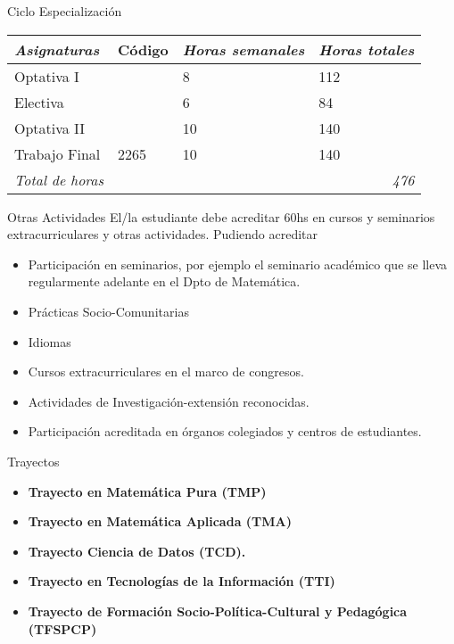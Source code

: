 \documentclass[11pt]{beamer}
\begin{document}
\begin{frame}{Ciclo Especialización}
 \fontsize{12pt}{12pt}\selectfont
 \begin{center}
\begin{tabularx}{1\textwidth}{|p{5cm}|p{1.5cm}|p{1.5cm}|p{1.5cm}|}
\hline
  \rowcolor[gray]{.9}
\emph{Asignaturas  } & Código&\emph{Horas semanales} & 
\emph{Horas totales}      \\ \hline
Optativa I                     &           &            8        &         112        \\ \hline
 Electiva                 &            &    6                &        84          \\ \hline
 Optativa II                    &            &           10         &          140        \\ \hline
 Trabajo Final                     & 2265         &       10             &          140        \\ \hline
\emph{Total de horas }    & \multicolumn{3}{r|}{\emph{476 }} \\ \hline
\end{tabularx}
\end{center}
\end{frame}
 
 \begin{frame}{Otras Actividades}
 El/la estudiante debe acreditar 60hs en cursos y seminarios extracurriculares y otras actividades. Pudiendo
acreditar
\begin{itemize}
\item<+->Participación en seminarios, por ejemplo el seminario académico que se lleva regularmente adelante
en el Dpto de Matemática.
\item<+->Prácticas Socio-Comunitarias
\item<+->Idiomas
\item<+->Cursos extracurriculares en el marco de congresos.
\item<+->Actividades de Investigación-extensión reconocidas.
\item<+->Participación acreditada en órganos colegiados y centros de estudiantes.
\end{itemize}
 \end{frame}
\begin{frame}{Trayectos}
 \begin{itemize}
  \item<+->\textbf{Trayecto en Matemática Pura (TMP)}
  \item<+->\textbf{Trayecto en Matemática Aplicada (TMA)}
  \item<+->\textbf{Trayecto Ciencia de Datos (TCD).}
  \item<+->\textbf{Trayecto en Tecnologías de la Información (TTI)}
  \item<+->\textbf{Trayecto de Formación Socio-Política-Cultural y Pedagógica (TFSPCP)}
 \end{itemize}

\end{frame}
\end{document}
